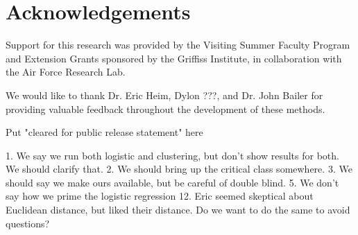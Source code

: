\documentclass[letterpaper]{article} %
\newcommand{\km}[1]{{\color{red} #1}} %
\newcommand{\wdb}[1]{{\color{blue} #1}} %
\begin{document}
\section{Acknowledgements} 

Support for this research was provided by the Visiting Summer Faculty Program and Extension Grants sponsored by the Griffiss Institute, in collaboration with the Air Force Research Lab. 

We would like to thank Dr. Eric Heim, Dylon \km{???}, and Dr. John Bailer for providing valuable feedback throughout the development of these methods. 

\km{Put "cleared for public release statement" here}


\wdb{1. We say we run both logistic and clustering, but don't show results for both. We should clarify that. 2. We should bring up the critical class somewhere. 3. We should say we make ours available, but be careful of double blind. 5. We don't say how we prime the logistic regression 12. Eric seemed skeptical about Euclidean distance, but liked their distance. Do we want to do the same to avoid questions?}


\newpage



\end{document}
